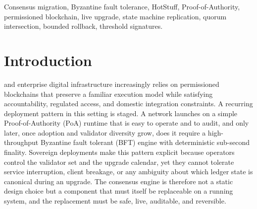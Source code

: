 \documentclass[journal]{IEEEtran}
\theoremstyle{remark}
\begin{document}
\begin{abstract}
cutover-evidence latency of 105.2 microseconds in simulator time. Across the partition
matrix a disjoint-quorum exposure metric separates the strategies: under a cutover-straddling
balanced partition, hard fork and blind cutover are exposed to a fork window in every trial
while SAGE's certified cutover keeps exposure at zero. Because the serialized simulator cannot
realize a concurrent two-leader conflict, we additionally drive the real engines in the
multi-process testbed under an identical balanced partition at the cutover height: the
ungated control forks in every run while quorum-gated SAGE forks in none, so the
fork SAGE prevents is exhibited as a measured event rather than a structural impossibility.
A bounded model check exhaustively verifies cross-boundary safety, cutover-decision
uniqueness, and no-absolute-reversion over $n\in\{4,7,10\}$ and all partition splits, with
falsifying broken controls the checker must catch. The local runtime additionally exercises
SAGE cutover, post-cutover HotStuff finalization, store-backed double-vote rejection, and
restart/continue recovery from in-memory snapshots.
\end{abstract}

\begin{IEEEkeywords}
Consensus migration, Byzantine fault tolerance, HotStuff, Proof-of-Authority, permissioned
blockchain, live upgrade, state machine replication, quorum intersection, bounded
rollback, threshold signatures.
\end{IEEEkeywords}

\section{Introduction}
 and enterprise digital infrastructure increasingly relies on
permissioned blockchains that preserve a familiar execution model while satisfying
accountability, regulated access, and domestic integration constraints. A recurring
deployment pattern in this setting is staged. A network launches on a simple
Proof-of-Authority (PoA) runtime that is easy to operate and to audit, and only later,
once adoption and validator diversity grow, does it require a high-throughput Byzantine
fault tolerant (BFT) engine with deterministic sub-second finality. Sovereign deployments
make this pattern explicit because operators control the validator set and the upgrade
calendar, yet they cannot tolerate service interruption, client breakage, or any
ambiguity about which ledger state is canonical during an upgrade. The consensus engine is
therefore not a static design choice but a component that must itself be replaceable on a
running system, and the replacement must be safe, live, auditable, and reversible.
\end{document}
